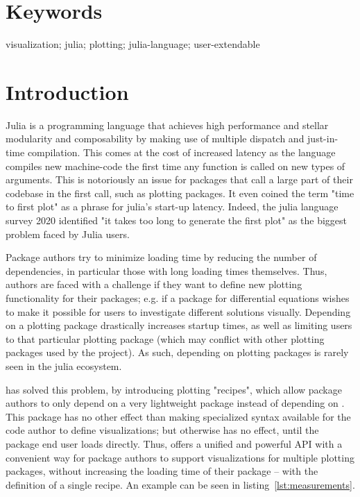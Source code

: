 \section*{Keywords}

visualization; julia; plotting; julia-language; user-extendable

\section*{Introduction}


Julia\cite{bezansonJuliaFreshApproach2017a} is a programming language that achieves high performance and stellar modularity and composability by making use of multiple dispatch and just-in-time compilation.
This comes at the cost of increased latency as the language compiles new machine-code the first time any function is called on new types of arguments.
This is notoriously an issue for packages that call a large part of their codebase in the first call, such as plotting packages.
It even coined the term "time to first plot" as a phrase for julia's start-up latency.
Indeed, the julia language survey 2020\cite{shah2020JuliaUser} identified "it takes too long to generate the first plot" as the biggest problem faced by Julia users.

Package authors try to minimize loading time by reducing the number of dependencies, in particular those with long loading times themselves.
Thus, authors are faced with a challenge if they want to define new plotting functionality for their packages; e.g. if a package for differential equations wishes to make it possible for users to investigate different solutions visually.
Depending on a plotting package drastically increases startup times, as well as limiting users to that particular plotting package (which may conflict with other plotting packages used by the project).
As such, depending on plotting packages is rarely seen in the julia ecosystem.

\Plots has solved this problem, by introducing plotting "recipes", which allow package authors to only depend on a very lightweight package  instead of depending on \Plots.
This package has no other effect than making specialized syntax available for the code author to define visualizations; but otherwise has no effect, until the package end user loads \Plots directly.
Thus, \Plots offers a unified and powerful API with a convenient way for package authors to support visualizations for multiple plotting packages, without increasing the loading time of their package – with the definition of a single recipe.
An example can be seen in listing~\ref{lst:measurements}.

